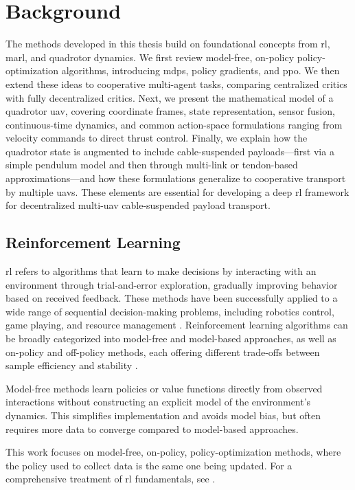 \chapter{Background}
The methods developed in this thesis build on foundational concepts from \gls{rl}, \gls{marl}, and quadrotor dynamics. We first review model-free, on-policy policy-optimization algorithms, introducing \gls{mdp}s, policy gradients, and \gls{ppo}. We then extend these ideas to cooperative multi-agent tasks, comparing centralized critics with fully decentralized critics. Next, we present the mathematical model of a quadrotor \gls{uav}, covering coordinate frames, state representation, sensor fusion, continuous-time dynamics, and common action-space formulations ranging from velocity commands to direct thrust control. Finally, we explain how the quadrotor state is augmented to include cable-suspended payloads—first via a simple pendulum model and then through multi-link or tendon-based approximations—and how these formulations generalize to cooperative transport by multiple \glspl{uav}. These elements are essential for developing a deep \gls{rl} framework for decentralized multi-\gls{uav} cable-suspended payload transport.

\section{Reinforcement Learning}
\gls{rl} refers to algorithms that learn to make decisions by interacting with an environment through trial-and-error exploration, gradually improving behavior based on received feedback. These methods have been successfully applied to a wide range of sequential decision-making problems, including robotics control, game playing, and resource management \cite{mnih2015human}. Reinforcement learning algorithms can be broadly categorized into model-free and model-based approaches, as well as on-policy and off-policy methods, each offering different trade-offs between sample efficiency and stability \cite{Schulman2015TrustRP}.  

Model-free methods learn policies or value functions directly from observed interactions without constructing an explicit model of the environment's dynamics. This simplifies implementation and avoids model bias, but often requires more data to converge compared to model-based approaches.  

This work focuses on model-free, on-policy, policy-optimization methods, where the policy used to collect data is the same one being updated. For a comprehensive treatment of \gls{rl} fundamentals, see \cite{SuttonBarto2018}.
